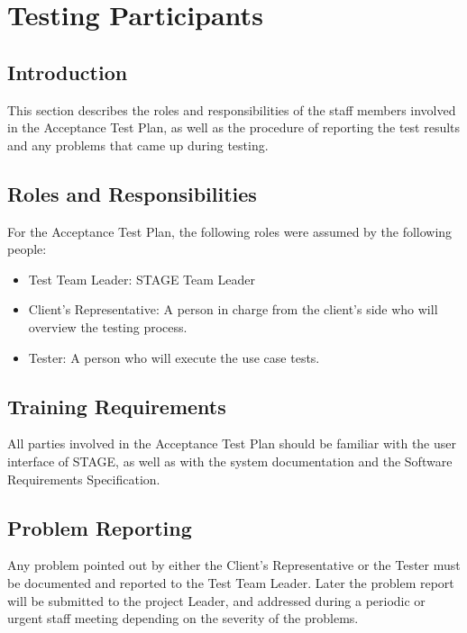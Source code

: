 \documentclass[titlepage]{article}
\begin{document}
\section{Testing Participants%
    \label{participiants}%
}


\subsection{Introduction}
    This section describes the roles and responsibilities of the staff members involved in the Acceptance Test Plan, as well as the procedure of reporting the test results and any problems that came up during testing.


\subsection{Roles and Responsibilities}
    For the Acceptance Test Plan, the following roles were assumed by the following people:
    \begin{itemize}
        \item Test Team Leader: STAGE Team Leader
        \item Client's Representative: A person in charge from the client's side who will overview the testing process.
        \item Tester: A person who will execute the use case tests.
    \end{itemize}


\subsection{Training Requirements}
    All parties involved in the Acceptance Test Plan should be familiar with the user interface of STAGE, as well as with the system documentation and the Software Requirements Specification.


\subsection{Problem Reporting}
    Any problem pointed out by either the Client's Representative or the Tester must be documented and reported to the Test Team Leader. Later the problem report will be submitted to the project Leader, and addressed during a periodic or urgent staff meeting depending on the severity of the problems.
\end{document}
